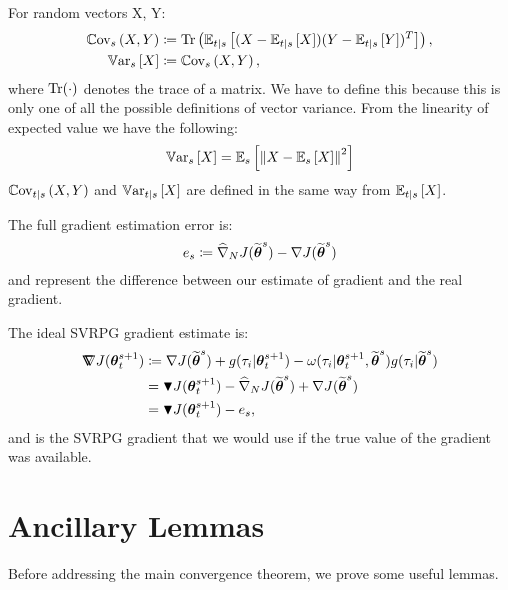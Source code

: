 \begin{definition}\label{def:var}
	For random vectors X, Y:
	\begin{align*}
	\Covs{X}{Y} &\coloneqq \Tr\left(\Ets{(X-\Ets{X})(Y-\Ets{Y})^T}\right), \\
	\Vars{X} &\coloneqq \Covs{X}{Y},
	\end{align*}
	where $\Tr(\cdot)$ denotes the trace of a matrix. We have to define this because this is only one of all the possible definitions of vector variance. From the linearity of expected value we have the following:
	\begin{equation}\label{neweq:1}
	\Vars{X} = \Es{\norm[]{X-\Es{X}}^2}
	\end{equation}
	$\Covts[t]{X}{Y}$ and $\Varts[t]{X}$ are defined in the same way from $\Ets[t]{X}$.
\end{definition}

\begin{definition}
	The full gradient estimation error is:
	\[
	e_s \coloneqq \gradApp{\wt{\vtheta}^s}{N} - \gradJ{\wt{\vtheta}^s} 
	\]
	and represent the difference between our estimate of gradient and the real gradient.
\end{definition}

\begin{definition}\label{def:ideal}
	The ideal \acs{SVRPG} gradient estimate is:
	\begin{align*}
	\gradIdeal{\vtheta_t^{s+1}} &\coloneqq 
	\gradJ{\wt{\vtheta}^s}
	+ g(\tau_i|\vtheta^{s+1}_t)
	- \omega(\tau_i|\vtheta^{s+1}_t, \wt{\vtheta}^s) g(\tau_i|\wt{\vtheta}^s)
	\\
	&= \gradBlack{\vtheta_t^{s+1}} - \gradApp{\wt{\vtheta}^s}{N} + \gradJ{\wt{\vtheta}^s} \\
	&= \gradBlack{\vtheta_t^{s+1}} - e_s,
	\end{align*} and is the SVRPG gradient that we would use if the true value of the gradient was available.
\end{definition}


\section{Ancillary Lemmas}\label{sec:ancillarylemmas}

Before addressing the main convergence theorem, we prove some useful lemmas.


